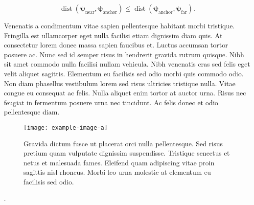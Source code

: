 \documentclass{jov}
\renewcommand{\vec}{\bm}
\begin{document}
	\begin{equation}
		\operatorname{dist}(\vec{\psi}_\text{near}, \vec{\psi}_\text{anchor}) \le \operatorname{dist}(\vec{\psi}_\text{anchor},\vec{\psi}_\text{far}).\label{eq:triplet-agreement}
	\end{equation}

	Venenatis a condimentum vitae sapien pellentesque habitant morbi tristique. Fringilla est ullamcorper eget nulla facilisi etiam dignissim diam quis. At consectetur lorem donec massa sapien faucibus et. Luctus accumsan tortor posuere ac. Nunc sed id semper risus in hendrerit gravida rutrum quisque. Nibh sit amet commodo nulla facilisi nullam vehicula. Nibh venenatis cras sed felis eget velit aliquet sagittis. Elementum eu facilisis sed odio morbi quis commodo odio. Non diam phasellus vestibulum lorem sed risus ultricies tristique nulla. Vitae congue eu consequat ac felis. Nulla aliquet enim tortor at auctor urna. Risus nec feugiat in fermentum posuere urna nec tincidunt. Ac felis donec et odio pellentesque diam. 
	

	\begin{figure}[bt]
		\centering
		\texttt{[image: example-image-a]}
		\caption{Gravida dictum fusce ut placerat orci nulla pellentesque. Sed risus pretium quam vulputate dignissim suspendisse. Tristique senectus et netus et malesuada fames. Eleifend quam adipiscing vitae proin sagittis nisl rhoncus. Morbi leo urna molestie at elementum eu facilisis sed odio.}
		\label{fig:imagea}
	\end{figure}

. 
	


	
	\clearpage

	
	
	
	\appendix
	
	\newpage 
\end{document}
